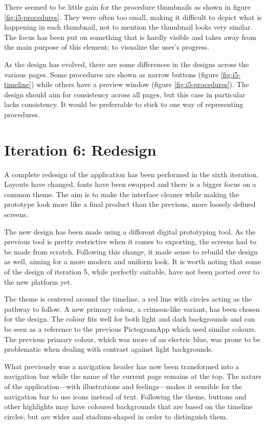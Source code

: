 There seemed to be little gain for the procedure thumbnails as shown in figure \ref{fig:i5-procedures}. They were often too small, making it difficult to depict what is happening in each thumbnail, not to mention the thumbnail looks very similar. The focus has been put on something that is hardly visible and takes away from the main purpose of this element; to visualize the user's progress.

As the design has evolved, there are some differences in the designs across the various pages. Some procedures are shown as narrow buttons (figure \ref{fig:i5-timeline}) while others have a preview window (figure \ref{fig:i5-procedures}). The design should aim for consistency across all pages, but this case in particular lacks consistency. It would be preferrable to stick to one way of representing procedures.

\section{Iteration 6: Redesign}
\label{sec:iteration6}

A complete redesign of the application has been performed in the sixth iteration. Layouts have changed, fonts have been swapped and there is a bigger focus on a common theme. The aim is to make the interface cleaner while making the prototype look more like a final product than the previous, more loosely defined screens.

The new design has been made using a different digital prototyping tool. As the previous tool is pretty restrictive when it comes to exporting, the screens had to be made from scratch. Following this change, it made sense to rebuild the design as well, aiming for a more modern and uniform look. It is worth noting that some of the design of iteration 5, while perfectly suitable, have not been ported over to the new platform yet.

The theme is centered around the timeline, a red line with circles acting as the pathway to follow. A new primary colour, a crimson-like variant, has been chosen for the design. The colour fits well for both light and dark backgrounds and can be seen as a reference to the previous PictogramApp which used similar colours. The previous primary colour, which was more of an electric blue, was prone to be problematic when dealing with contrast against light backgrounds.

What previously was a navigation header has now been transformed into a navigation bar while the name of the current page remains at the top. The nature of the application---with illustrations and feelings---makes it sensible for the navigation bar to use icons instead of text. Following the theme, buttons and other highlights may have coloured backgrounds that are based on the timeline circles, but are wider and stadium-shaped in order to distinguish them.

